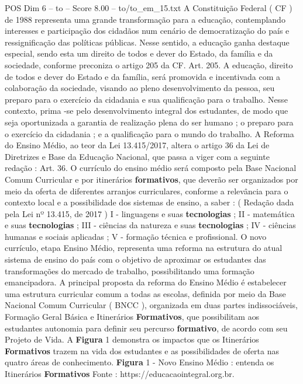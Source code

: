 \begin{textsample}{POS Dim 6 – to – Score 8.00 – to/to\_em\_15.txt}  \label{ex:f6_pos_175}
A Constituição Federal ( CF ) de 1988 representa uma grande transformação para a educação, contemplando interesses e participação dos cidadãos num cenário de democratização do país e ressignificação das políticas públicas.
Nesse sentido, a educação ganha destaque especial, sendo esta um direito de todos e dever do Estado, da família e da sociedade, conforme preconiza o artigo 205 da CF.
Art. 205.
A educação, direito de todos e dever do Estado e da família, será promovida e incentivada com a colaboração da sociedade, visando ao pleno desenvolvimento da pessoa, seu preparo para o exercício da cidadania e sua qualificação para o trabalho.
Nesse contexto, prima -se pelo desenvolvimento integral dos estudantes, de modo que seja oportunizada a garantia de realização plena do ser humano ; o preparo para o exercício da cidadania ; e a qualificação para o mundo do trabalho.
A Reforma do Ensino Médio, ao teor da Lei 13.415/2017, altera o artigo 36 da Lei de Diretrizes e Base da Educação Nacional, que passa a viger com a seguinte redação : Art. 36.
O currículo do ensino médio será composto pela Base Nacional Comum Curricular e por itinerários \textbf{formativos}, que deverão ser organizados por meio da oferta de diferentes arranjos curriculares, conforme a relevância para o contexto local e a possibilidade dos sistemas de ensino, a saber : ( Redação dada pela Lei nº 13.415, de 2017 ) I - linguagens e suas \textbf{tecnologias} ; II - matemática e suas \textbf{tecnologias} ; III - ciências da natureza e suas \textbf{tecnologias} ; IV - ciências humanas e sociais aplicadas ; V - formação técnica e profissional.
O novo currículo, etapa Ensino Médio, representa uma reforma na estrutura do atual sistema de ensino do país com o objetivo de aproximar os estudantes das transformações do mercado de trabalho, possibilitando uma formação emancipadora.
A principal proposta da reforma do Ensino Médio é estabelecer uma estrutura curricular comum a todas as escolas, definida por meio da Base Nacional Comum Curricular ( BNCC ), organizada em duas partes indissociáveis, Formação Geral Básica e Itinerários \textbf{Formativos}, que possibilitam aos estudantes autonomia para definir seu percurso \textbf{formativo}, de acordo com seu Projeto de Vida.
A \textbf{Figura} 1 demonstra os impactos que os Itinerários \textbf{Formativos} trazem na vida dos estudantes e as possibilidades de oferta nas quatro áreas de conhecimento. \textbf{Figura} 1 - Novo Ensino Médio : entenda os Itinerários \textbf{Formativos} Fonte : https://educacaointegral.org.br.

\end{textsample}
